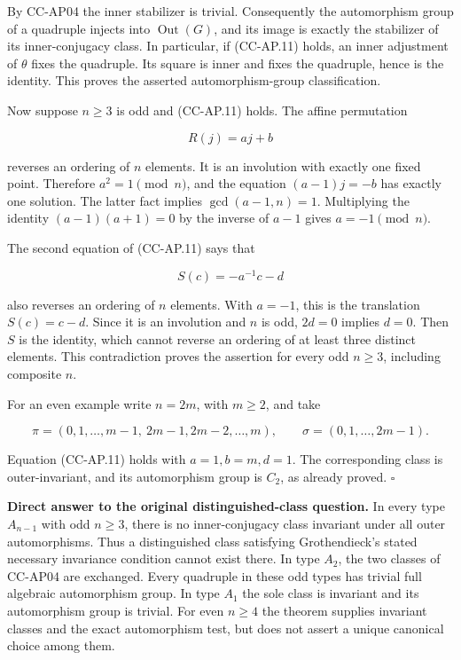 \documentclass[11pt,a4paper]{article}
\theoremstyle{definition}\newtheorem{definition}[theorem]{Definition}
\theoremstyle{remark}\newtheorem{remark}[theorem]{Remark}
\begin{document}
By CC-AP04 the inner stabilizer is trivial. Consequently the
automorphism group of a quadruple injects into
\(\operatorname{Out}(G)\), and its image is exactly the stabilizer of
its inner-conjugacy class. In particular, if (CC-AP.11) holds, an inner
adjustment of \(\theta\) fixes the quadruple. Its square is inner and
fixes the quadruple, hence is the identity. This proves the asserted
automorphism-group classification.

Now suppose \(n\geq3\) is odd and (CC-AP.11) holds. The affine
permutation

\[
 R(j)=aj+b
\]

reverses an ordering of \(n\) elements. It is an involution with exactly
one fixed point. Therefore \(a^2=1\pmod n\), and the equation
\((a-1)j=-b\) has exactly one solution. The latter fact implies
\(\gcd(a-1,n)=1\). Multiplying the identity \((a-1)(a+1)=0\) by the
inverse of \(a-1\) gives \(a=-1\pmod n\).

The second equation of (CC-AP.11) says that

\[
 S(c)=-a^{-1}c-d
\]

also reverses an ordering of \(n\) elements. With \(a=-1\), this is the
translation \(S(c)=c-d\). Since it is an involution and \(n\) is odd,
\(2d=0\) implies \(d=0\). Then \(S\) is the identity, which cannot
reverse an ordering of at least three distinct elements. This
contradiction proves the assertion for every odd \(n\geq3\), including
composite \(n\).

For an even example write \(n=2m\), with \(m\geq2\), and take

\[
 \pi=(0,1,\ldots,m-1,\ 2m-1,2m-2,\ldots,m),\qquad
 \sigma=(0,1,\ldots,2m-1).
\]

Equation (CC-AP.11) holds with \(a=1,b=m,d=1\). The corresponding class
is outer-invariant, and its automorphism group is \(C_2\), as already
proved. \(\square\)

\textbf{Direct answer to the original distinguished-class question.} In
every type \(A_{n-1}\) with odd \(n\geq3\), there is no inner-conjugacy
class invariant under all outer automorphisms. Thus a distinguished
class satisfying Grothendieck's stated necessary invariance condition
cannot exist there. In type \(A_2\), the two classes of CC-AP04 are
exchanged. Every quadruple in these odd types has trivial full algebraic
automorphism group. In type \(A_1\) the sole class is invariant and its
automorphism group is trivial. For even \(n\geq4\) the theorem supplies
invariant classes and the exact automorphism test, but does not assert a
unique canonical choice among them.
\end{document}

